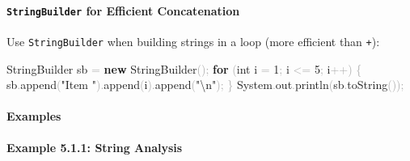 \documentclass[
  justified,
  openright,
]{tufte-book}
\let\subsection\paragraph
\let\paragraph\paragraph
\newcommand{\KeywordTok}[1]{\textcolor{CodeKeyword}{\textbf{#1}}}  %
\newcommand{\StringTok}[1]{\textcolor{CodeString}{#1}}              %
\newcommand{\CodeNumTok}[1]{\textcolor{CodeNumber}{#1}}             %
\newcommand{\CodeFuncTok}[1]{\textcolor{CodeKeyword}{#1}}           %
\newcommand{\CodeTypeTok}[1]{\textcolor{CodeType}{#1}}              %
\newcommand{\OperatorTok}[1]{\textcolor{DarkGray}{#1}}              %
\newenvironment{Shaded}{%
  \begin{mdframed}[style=TufteCode]%
}{%
  \end{mdframed}%
}
\let\subsection\paragraph
\let\paragraph\paragraph
\begin{document}
\subsection{\texorpdfstring{\texttt{StringBuilder} for Efficient
Concatenation}{StringBuilder for Efficient Concatenation}}\label{stringbuilder-for-efficient-concatenation}

Use \texttt{StringBuilder} when building strings in a loop (more
efficient than \texttt{+}):

\begin{Shaded}
\begin{Highlighting}[]
StringBuilder sb \OperatorTok{=} \KeywordTok{new} StringBuilder\OperatorTok{();}
\KeywordTok{for} \OperatorTok{(}\CodeTypeTok{int} i \OperatorTok{=} \CodeNumTok{1}\OperatorTok{;} i \OperatorTok{\textless{}=} \CodeNumTok{5}\OperatorTok{;} i\OperatorTok{++)} \OperatorTok{\{}
    sb\OperatorTok{.}\CodeFuncTok{append}\OperatorTok{(}\StringTok{"Item "}\OperatorTok{).}\CodeFuncTok{append}\OperatorTok{(}i\OperatorTok{).}\CodeFuncTok{append}\OperatorTok{(}\StringTok{"}\StringTok{\textbackslash{}n}\StringTok{"}\OperatorTok{);}
\OperatorTok{\}}
System\OperatorTok{.}\CodeFuncTok{out}\OperatorTok{.}\CodeFuncTok{println}\OperatorTok{(}sb\OperatorTok{.}\CodeFuncTok{toString}\OperatorTok{());}
\end{Highlighting}
\end{Shaded}

\subsection{Examples}\label{examples-25}

\textbf{Example 5.1.1: String Analysis}
\end{document}
